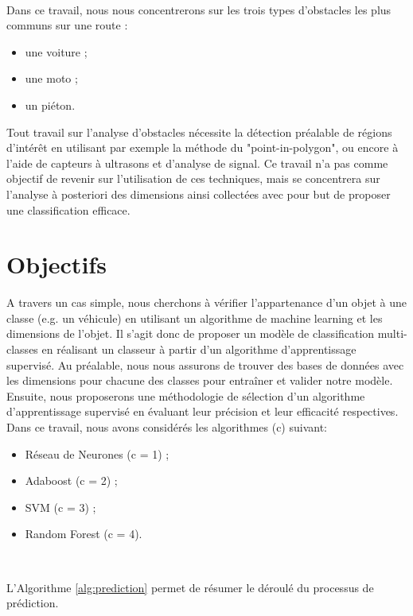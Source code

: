 \documentclass[a4paper]{report}
\begin{document}
~\par

Dans ce travail, nous nous concentrerons sur les trois types d'obstacles les plus communs sur une route :
\begin{itemize}
\item une voiture ;
\item une moto ;
\item un piéton.

\end{itemize}

Tout travail sur l'analyse d'obstacles nécessite la détection préalable de régions d'intérêt en utilisant par exemple la méthode du "point-in-polygon"\cite{ref1}, ou encore à l'aide de capteurs à ultrasons et d'analyse de signal\cite{ref2}. Ce travail n'a pas comme objectif de revenir sur l'utilisation de ces techniques, mais se concentrera sur l'analyse à posteriori des dimensions ainsi collectées avec pour but de proposer une classification efficace. 

\section*{Objectifs}
A travers un cas simple, nous cherchons à vérifier l'appartenance d'un objet à une classe (e.g. un véhicule) en utilisant un algorithme de machine learning et les dimensions de l'objet. Il s'agit donc de proposer un modèle de classification multi-classes en réalisant un classeur à partir d'un algorithme d'apprentissage supervisé. 
Au préalable, nous nous assurons de trouver des bases de données avec les dimensions pour chacune des classes pour entraîner et valider notre modèle. 
Ensuite, nous proposerons une méthodologie de sélection d'un algorithme d'apprentissage supervisé en évaluant leur précision et leur efficacité respectives. Dans ce travail, nous avons considérés les algorithmes (c) suivant: 
\begin{itemize}
\item Réseau de Neurones (c = 1) ;
\item Adaboost (c = 2) ;
\item SVM (c = 3) ;
\item Random Forest (c = 4).
\end{itemize}

~\par

\noindent L'Algorithme \ref{alg:prediction} permet de résumer le déroulé du processus de prédiction.
\end{document}
